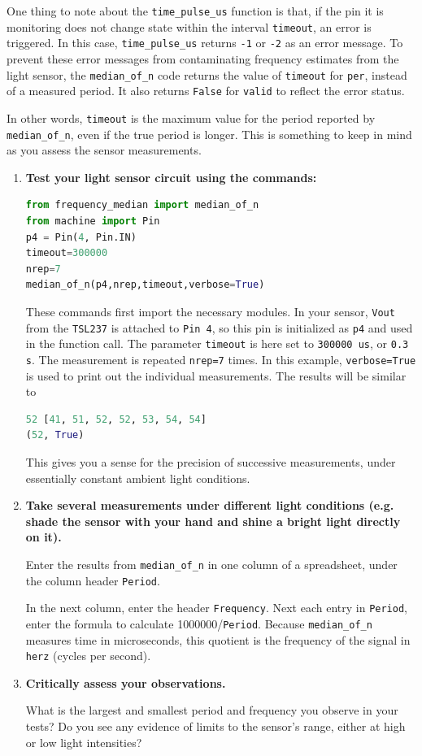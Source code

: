 One thing to note about the \lstinline{time_pulse_us} function is that, if the pin it is monitoring does not change state within the interval \texttt{timeout}, an error is triggered.
In this case, \lstinline{time_pulse_us} returns \texttt{-1} or \texttt{-2} as an error message.
To prevent these error messages from contaminating frequency estimates from the light sensor, the \lstinline{median_of_n} code returns the value of \texttt{timeout} for \lstinline{per}, instead of a measured period.
It also returns \texttt{False} for \lstinline{valid} to reflect the error status.

\smallskip
In other words, \texttt{timeout} is the maximum value for the period reported by \lstinline{median_of_n}, even if the true period is longer.
This is something to keep in mind as you assess the sensor measurements.

\begin{enumerate}[resume]
	\item \textbf{Test your light sensor circuit using the commands:}
\begin{lstlisting}[language=Python]
from frequency_median import median_of_n
from machine import Pin
p4 = Pin(4, Pin.IN)
timeout=300000
nrep=7
median_of_n(p4,nrep,timeout,verbose=True)
\end{lstlisting}	
	These commands first import the necessary modules.
	In your sensor, \texttt{Vout} from the \texttt{TSL237} is attached to \texttt{Pin 4}, so this pin is initialized as \texttt{p4} and used in the function call.
	The parameter \texttt{timeout} is here set to \texttt{300000 us}, or \texttt{0.3 s}.
	The measurement is repeated \texttt{nrep=7} times.
	In this example, \texttt{verbose=True} is used to print out the individual measurements.
	The results will be similar to
\begin{lstlisting}[language=Python]
52 [41, 51, 52, 52, 53, 54, 54]
(52, True)
\end{lstlisting}		
	This gives you a sense for the precision of successive measurements, under essentially constant ambient light conditions.
	 	
	\item \textbf{Take several measurements under different light conditions (e.g. shade the sensor with your hand and shine a bright light directly on it).}
	
	Enter the results from \lstinline{median_of_n} in one column of a spreadsheet, under the column header \texttt{Period}.
	
	\smallskip
	In the next column, enter the header \texttt{Frequency}.
	Next each entry in \texttt{Period}, enter the formula to calculate 1000000/\texttt{Period}.
	Because \lstinline{median_of_n} measures time in microseconds, this quotient is the frequency of the signal in \texttt{herz} (cycles per second).
	
	\item \textbf{Critically assess your observations.}
	
	What is the largest and smallest period and frequency you observe in your tests?
	Do you see any evidence of limits to the sensor's range, either at high or low light intensities?
\end{enumerate}



